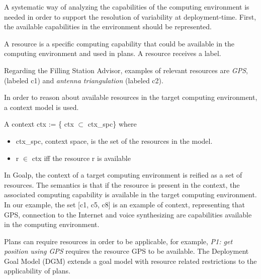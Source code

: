 A systematic way of analyzing the capabilities of the computing environment is needed in order to support the resolution of variability at deployment-time. First, the available capabilities in the environment should be represented.

\begin{defn}[Resource]

  A resource is a specific computing capability that could be available in the computing environment and used in plans. A resource receives a label.

\end{defn}

Regarding the Filling Station Advisor, examples of relevant resources are \emph{GPS}, (labeled c1) and \emph{antenna triangulation} (labeled c2).

In order to reason about available resources in the target computing environment, a context model is used.

\begin{defn}[Context]

  A context ctx := \{ ctx $\subset$  ctx\_spc\} where
  \begin{itemize}
    \item ctx\_spc, context space, is the set of the resources in the model.
    \item r $\in$ ctx iff the resource r is available
  \end{itemize}

\end{defn}


In Goalp, the context of a target computing environment is reified as a set of resources.
The semantics is that if the resource is present in the context, the associated computing capability is available in the target computing environment.
In our example, the set [c1, c5, c8] is an example of context, representing that GPS, connection to the Internet and voice synthesizing are capabilities available in the computing environment.

Plans can require resources in order to be applicable, for example, \emph{P1: get position using GPS} requires the resource GPS to be available. The Deployment Goal Model (DGM) extends a goal model with resource related restrictions to the applicability of plans.


